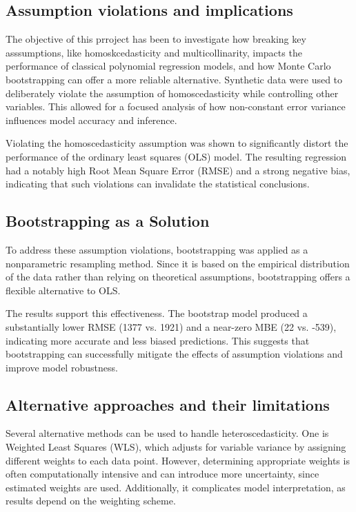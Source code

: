 \subsection{Assumption violations and implications}
The objective of this prroject has been to investigate how breaking key asssumptions, like homoskcedasticity and multicollinarity, impacts the performance of classical polynomial regression models, and how Monte Carlo bootstrapping can offer a more reliable alternative. Synthetic data were used to deliberately violate the assumption of homoscedasticity while controlling other variables. This allowed for a focused analysis of how non-constant error variance influences model accuracy and inference.

\noindent Violating the homoscedasticity assumption was shown to significantly distort the performance of the ordinary least squares (OLS) model. The resulting regression had a notably high Root Mean Square Error (RMSE) and a strong negative bias, indicating that such violations can invalidate the statistical conclusions. 

\subsection{Bootstrapping as a Solution}
To address these assumption violations, bootstrapping was applied as a nonparametric resampling method. Since it is based on the empirical distribution of the data rather than relying on theoretical assumptions, bootstrapping offers a flexible alternative to OLS.

\noindent The results support this effectiveness. The bootstrap model produced a substantially lower RMSE (1377 vs. 1921) and a near-zero MBE (22 vs. -539), indicating more accurate and less biased predictions. This suggests that bootstrapping can successfully mitigate the effects of assumption violations and improve model robustness.

\subsection{Alternative approaches and their limitations}
Several alternative methods can be used to handle heteroscedasticity. One is Weighted Least Squares (WLS), which adjusts for variable variance by assigning different weights to each data point. However, determining appropriate weights is often computationally intensive and can introduce more uncertainty, since estimated weights are used. Additionally, it complicates model interpretation, as results depend on the weighting scheme.

